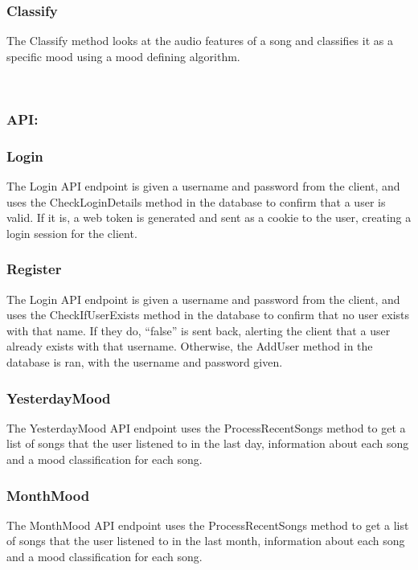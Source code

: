 \documentclass[10pt, notitlepage]{report}
\begin{document}
\subsubsection{Classify}
The Classify method looks at the audio features of a song and classifies it as a specific mood using a mood defining algorithm.


\leavevmode \\

\subsubsection{API:}

\hrulefill

\subsubsection{Login}
The Login API endpoint is given a username and password from the client, and uses the CheckLoginDetails method in the database to confirm that a user is valid. If it is, a web token is generated and sent as a cookie to the user, creating a login session for the client.

\subsubsection{Register}
The Login API endpoint is given a username and password from the client, and uses the CheckIfUserExists method in the database to confirm that no user exists with that name. If they do, “false” is sent back, alerting the client that a user already exists with that username. Otherwise, the AddUser method in the database is ran, with the username and password given.

\subsubsection{YesterdayMood}
The YesterdayMood API endpoint uses the ProcessRecentSongs method to get a list of songs that the user listened to in the last day, information about each song and a mood classification for each song.

\subsubsection{MonthMood}
The MonthMood API endpoint uses the ProcessRecentSongs method to get a list of songs that the user listened to in the last month, information about each song and a mood classification for each song.
\end{document}
